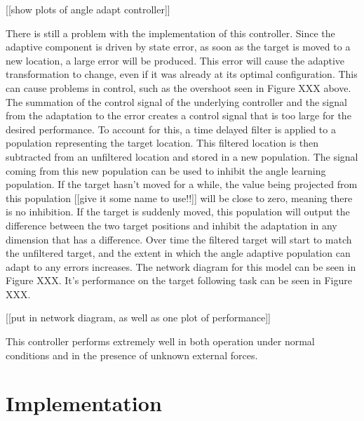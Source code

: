 \documentclass[letterpaper,12pt,titlepage,oneside,final]{book}
\begin{document}
[[show plots of angle adapt controller]]

There is still a problem with the implementation of this controller. Since the adaptive component is driven by state error, as soon as the target is moved to a new location, a large error will be produced. This error will cause the adaptive transformation to change, even if it was already at its optimal configuration. This can cause problems in control, such as the overshoot seen in Figure XXX above. The summation of the control signal of the underlying controller and the signal from the adaptation to the error creates a control signal that is too large for the desired performance. To account for this, a time delayed filter is applied to a population representing the target location. This filtered location is then subtracted from an unfiltered location and stored in a new population. The signal coming from this new population can be used to inhibit the angle learning population. If the target hasn’t moved for a while, the value being projected from this population [[give it some name to use!!]] will be close to zero, meaning there is no inhibition. If the target is suddenly moved, this population will output the difference between the two target positions and inhibit the adaptation in any dimension that has a difference. Over time the filtered target will start to match the unfiltered target, and the extent in which the angle adaptive population can adapt to any errors increases. The network diagram for this model can be seen in Figure XXX. It’s performance on the target following task can be seen in Figure XXX.

[[put in network diagram, as well as one plot of performance]]

This controller performs extremely well in both operation under normal conditions and in the presence of unknown external forces.

\section{Implementation}

\end{document}
